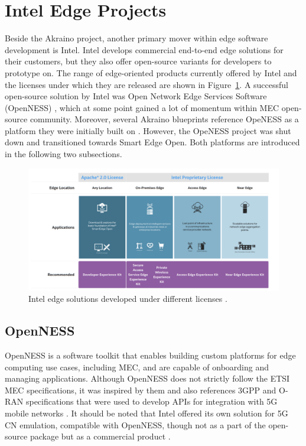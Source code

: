 \documentclass[12pt,a4paper,twoside]{report}
\begin{document}
\section{Intel Edge Projects}
Beside the Akraino project, another primary mover within edge software development is Intel. Intel develops commercial end-to-end edge solutions for their customers, but they also offer open-source variants for developers to prototype on. The range of edge-oriented products currently offered by Intel and the licenses under which they are released are shown in Figure~\ref{F:intel-solu}. A successful open-source solution by Intel was Open Network Edge Services Software (OpenNESS) \cite{sabella-mec-sw-dev}, which at some point gained a lot of momentum within MEC open-source community. Moreover, several Akraino blueprints reference OpeNESS as a platform they were initially built on \cite{cvb-docu,akraino-mec-slice-docu}. However, the OpeNESS project was shut down and transitioned towards Smart Edge Open. Both platforms are introduced in the following two subsections.
\begin{figure}[ht]
	\centering
	\includegraphics[width=13cm]{./images/intel-solu.png} 
	\caption{Intel edge solutions developed under different licenses \cite{seo-overview}.}
	\label{F:intel-solu}
\end{figure}

\subsection{OpenNESS}
OpenNESS is a software toolkit that enables building custom platforms for edge computing use cases, including MEC, and are capable of onboarding and managing applications. Although OpenNESS does not strictly follow the ETSI MEC specifications, it was inspired by them and also references 3GPP and O-RAN specifications that were used to develop APIs for integration with 5G mobile networks \cite{sabella-mec-sw-dev}. It should be noted that Intel offered its own solution for 5G CN emulation, compatible with OpenNESS, though not as a part of the open-source package but as a commercial product \cite{openness-git}.
\end{document}

